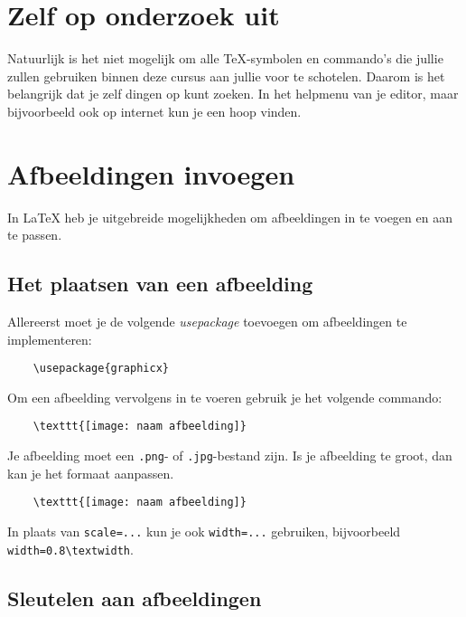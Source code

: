 \section{Zelf op onderzoek uit}
Natuurlijk is het niet mogelijk om alle \TeX-symbolen en commando's die jullie
zullen gebruiken binnen deze cursus aan jullie voor te schotelen. Daarom is het
belangrijk dat je zelf dingen op kunt zoeken. In het helpmenu van je editor,
maar bijvoorbeeld ook op internet kun je een hoop vinden.

\section{Afbeeldingen invoegen}

In \LaTeX{} heb je uitgebreide mogelijkheden om afbeeldingen in te voegen en aan
te passen.

\subsection{Het plaatsen van een afbeelding}

Allereerst moet je de volgende \emph{usepackage} toevoegen om afbeeldingen te
implementeren:
\begin{verbatim}
    \usepackage{graphicx}
\end{verbatim}
Om een afbeelding vervolgens in te voeren gebruik je het volgende commando:
\begin{verbatim}
    \texttt{[image: naam afbeelding]}
\end{verbatim}
Je afbeelding moet een \verb|.png|- of \verb|.jpg|-bestand zijn.
Is je afbeelding te groot, dan kan je het formaat aanpassen.
\begin{verbatim}
    \texttt{[image: naam afbeelding]}
\end{verbatim}
In plaats van \verb|scale=...| kun je ook \verb|width=...| gebruiken,
bijvoorbeeld \verb|width=0.8\textwidth|.

\subsection{Sleutelen aan afbeeldingen}

